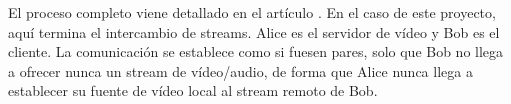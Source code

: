 \noindent El proceso completo viene detallado en el artículo \citep{wiki:WebRTCFullDesc}. En el caso de este proyecto, aquí termina el intercambio de streams. Alice es el servidor de vídeo y Bob es el cliente. La comunicación se establece como si fuesen pares, solo que Bob no llega a ofrecer nunca un stream de vídeo/audio, de forma que Alice nunca llega a establecer su fuente de vídeo local al stream remoto de Bob. 











